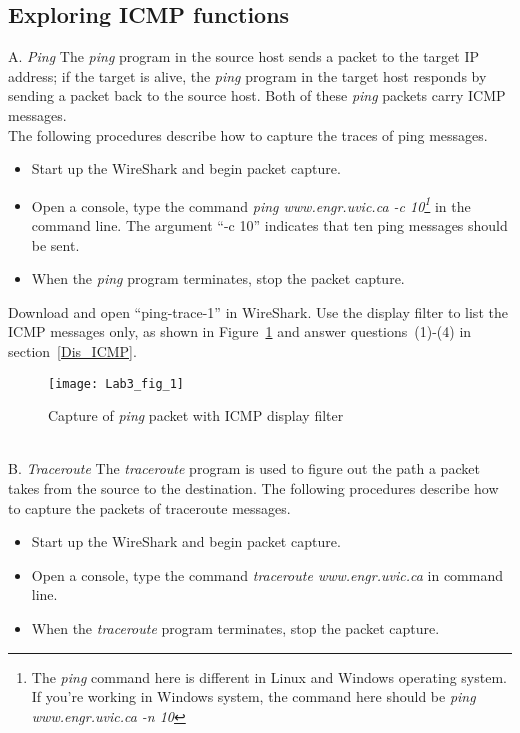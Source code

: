 \subsection{Exploring ICMP functions}\label{Pro_ICMP}
A. {\em Ping} The {\em ping} program in the source host sends a packet to the target IP address; if the target is alive, the {\em ping} program in the target host responds by sending a packet back to the source host. Both of these {\em ping} packets carry ICMP messages.\\

\noindent The following procedures describe how to capture the traces of ping messages.
\begin{itemize}
\item Start up the WireShark and begin packet capture.
 
\item Open a console, type the command \textit{ping www.engr.uvic.ca -c 10\footnote{The \textsl{ping} command here is different in Linux and Windows operating system. If you're working in Windows system, the command here should be \textsl{ping www.engr.uvic.ca -n 10}}} in the command line. The argument ``-c 10'' indicates that ten ping messages should be sent.

\item When the {\em ping} program terminates, stop the packet capture.

\end{itemize}

\noindent Download and open ``ping-trace-1'' in WireShark. Use the display filter to list the ICMP messages only, as shown in Figure~\ref{Lab3_fig_1} and answer questions~(1)-(4) in section~\ref{Dis_ICMP}.
\begin{figure}[hbt]
\centering
\texttt{[image: Lab3\_fig\_1]}
\caption{Capture of {\em ping} packet with ICMP display filter} \label{Lab3_fig_1}
\end{figure} \\

\noindent B. {\em Traceroute} The {\em traceroute} program is used to figure out the path a packet takes from the source to the destination. The following procedures describe how to capture the packets of traceroute messages.

\begin{itemize}
\item Start up the WireShark and begin packet capture.

\item Open a console, type the command \textit{traceroute www.engr.uvic.ca} in command line.

\item When the \textit{traceroute} program terminates, stop the packet capture.

\end{itemize}

